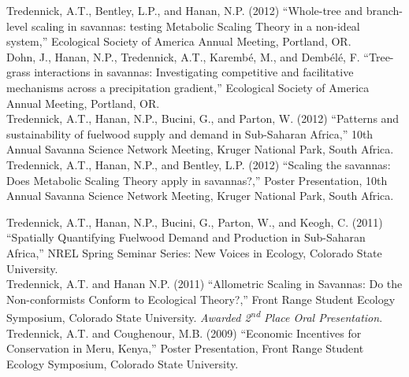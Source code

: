 \documentclass[margin,line]{resume}
\begin{document}
\begin{resume}
    Tredennick, A.T., Bentley, L.P., and Hanan, N.P. (2012) ``Whole-tree and branch-level scaling in savannas: testing Metabolic Scaling Theory in a non-ideal system,'' Ecological Society of America Annual Meeting, Portland, OR. \vspace{-6mm}\\%
    
    Dohn, J., Hanan, N.P., Tredennick, A.T., Karemb\'{e}, M., and Demb\'{e}l\'{e}, F. ``Tree-grass interactions in savannas: Investigating competitive and facilitative mechanisms across a precipitation gradient,'' Ecological Society of America Annual Meeting, Portland, OR. \vspace{-6mm}\\%
    
    Tredennick, A.T., Hanan, N.P., Bucini, G., and Parton, W. (2012) ``Patterns and sustainability of fuelwood supply and demand in Sub-Saharan Africa,'' 10th Annual Savanna Science Network Meeting, Kruger National Park, South Africa.\vspace{-6mm}\\%
    
    Tredennick, A.T., Hanan, N.P., and Bentley, L.P. (2012) ``Scaling the savannas: Does Metabolic Scaling Theory apply in savannas?,'' Poster Presentation, 10th Annual Savanna Science Network Meeting, Kruger National Park, South Africa. \vspace{-6mm}\\%
      \newpage
    
    Tredennick, A.T., Hanan, N.P., Bucini, G., Parton, W., and Keogh, C. (2011) ``Spatially Quantifying Fuelwood Demand and Production in Sub-Saharan Africa,'' NREL Spring Seminar Series: New Voices in Ecology, Colorado State University.\vspace{-6mm}\\%
    
    Tredennick, A.T. and Hanan N.P. (2011) ``Allometric Scaling in Savannas: Do the Non-conformists Conform to Ecological Theory?,'' Front Range Student Ecology Symposium, Colorado State University. \textsl{Awarded 2\textsuperscript{nd} Place Oral Presentation}.\vspace{-6mm}\\%
  
  Tredennick, A.T. and Coughenour, M.B. (2009) ``Economic Incentives for Conservation in Meru, Kenya,'' Poster Presentation, Front Range Student Ecology Symposium, Colorado State University.

\end{resume}
\end{document}
